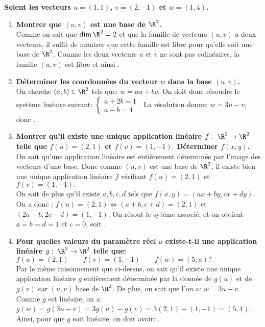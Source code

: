 \documentclass[a4paper, 11pt,reqno]{article}
\begin{document}
\begin{correction}  \;
	\textbf{Soient les vecteurs $u=(1,1)$, $v=(2,-1)$ et $w=(1,4)$.}
	\begin{enumerate}
		\item \textbf{Montrer que $(u,v)$ est une base de $\R^2$.}\\
		      Comme on sait que $\dim\R^2=2$ et que la famille de vecteurs $(u,v)$ a deux vecteurs, il suffit de montrer que cette famille est libre pour qu'elle soit une base de $\R^2$. Comme les deux vecteurs $u$ et $v$ ne sont pas colin\'eaires, la famille $(u,v)$ est libre et ainsi .
		\item \textbf{D\'eterminer les coordonn\'ees du vecteur $w$ dans la base $(u,v)$.}\\
		      On cherche $(a,b)\in\R^2$ tels que: $w=au+bv$. On doit donc r\'esoudre le syst\`eme lin\'eaire suivant: $\left\lbrace \begin{array}{lll} a+2b=1\\a-b=4 \end{array}\right.$. La r\'esolution donne: $w=3u-v$, donc .
		\item \textbf{Montrer qu'il existe une unique application lin\'eaire $f:\ \R^2\rightarrow \R^2$ telle que $f(u)=(2,1)$ et $f(v)=(1,-1).$ D\'eterminer $f(x,y)$.}\\
		      On sait qu'une application lin\'eaire est enti\`erement d\'etermin\'ee par l'image des vecteurs d'une base. Donc comme $(u,v)$ est une base de $\R^2$, il existe bien une unique application lin\'eaire $f$ v\'erifiant $f(u)=(2,1)$ et $f(v)=(1,-1).$\\
		      On sait de plus qu'il existe $a,b,c,d$ tels que $f(x,y) = (ax+by, cx+dy)$. On a donc : $f(u) = (2,1) \Leftrightarrow (a+b,c+d)=(2,1)$ et $(2a-b,2c-d)=(1,-1)$. On r\'esout le syt\`eme associ\'e, et on obtient $a=b=d=1$ et $c=0$, soit .
		\item \textbf{Pour quelles valeurs du param\`etre r\'eel $a$ existe-t-il une application lin\'eaire $g:\ \R^2\rightarrow \R^2$ telle que: $f(u)=(2,1)\qquad f(v)=(1,-1)\qquad f(w)=(5,a) ?$}\\
		      Par le m\^eme raisonnement que ci-dessus, on sait qu'il existe une unique application lin\'eaire $g$ enti\`erement d\'etermin\'ee par la donn\'ee de $g(u)$ et de $g(v)$ car $(u,v)$ base de $\R^2$. De plus, on sait que l'on a:  $w=3u-v$. Comme $g$ est lin\'eaire, on a: $g(w)=g(3u-v)=3g(u)-g(v)=3(2,1)-(1,-1)=(5,4)$. Ainsi, pour que $g$ soit lin\'eaire, on doit avoir: .
	\end{enumerate}
\end{correction}
\end{document}
